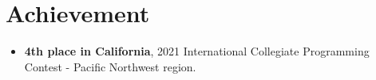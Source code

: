 \section{Achievement}
    \begin{itemize}[leftmargin=0in, label={}]
	\item  \small{
        \textbf{4th place in California}, 2021 International Collegiate Programming Contest - Pacific Northwest region.}
    \end{itemize}
